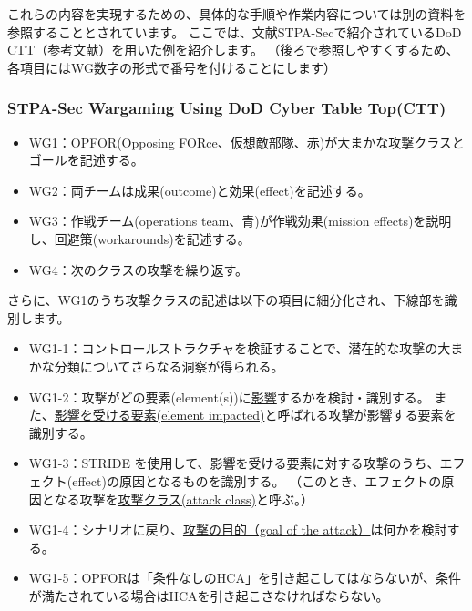 これらの内容を実現するための、具体的な手順や作業内容については別の資料を参照することとされています。
ここでは、文献STPA-Secで紹介されているDoD CTT（参考文献）を用いた例を紹介します。
（後ろで参照しやすくするため、各項目にはWG数字の形式で番号を付けることにします）

\subsubsection{STPA-Sec Wargaming Using DoD Cyber Table Top(CTT)}

\begin{itemize}
    \item WG1：OPFOR(Opposing FORce、仮想敵部隊、赤)が大まかな攻撃クラスとゴールを記述する。
    \item WG2：両チームは成果(outcome)と効果(effect)を記述する。
    \item WG3：作戦チーム(operations team、青)が作戦効果(mission effects)を説明し、回避策(workarounds)を記述する。
    \item WG4：次のクラスの攻撃を繰り返す。
\end{itemize}

さらに、WG1のうち攻撃クラスの記述は以下の項目に細分化され、下線部を識別します。
\begin{itemize}
    \item WG1-1：コントロールストラクチャを検証することで、潜在的な攻撃の大まかな分類についてさらなる洞察が得られる。
    \item WG1-2：攻撃がどの要素(element(s))に\underline{影響}するかを検討・識別する。
        また、\underline{影響を受ける要素(element impacted)}と呼ばれる攻撃が影響する要素を識別する。
    \item WG1-3：STRIDE を使用して、影響を受ける要素に対する攻撃のうち、エフェクト(effect)の原因となるものを識別する。
        （このとき、エフェクトの原因となる攻撃を\underline{攻撃クラス(attack class)}と呼ぶ。）
    \item WG1-4：シナリオに戻り、\underline{攻撃の目的（goal of the attack）}は何かを検討する。
    \item WG1-5：OPFORは「条件なしのHCA」を引き起こしてはならないが、条件が満たされている場合はHCAを引き起こさなければならない。
\end{itemize}

